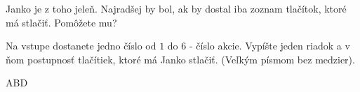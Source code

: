 
Janko je z toho jeleň. Najradšej by bol, ak by dostal iba zoznam tlačítok, ktoré má stlačiť.
Pomôžete mu?

Na vstupe dostanete jedno číslo od $1$ do $6$ - číslo akcie. Vypíšte jeden riadok a v ňom postupnosť
tlačítiek, ktoré má Janko stlačiť. (Veľkým písmom bez medzier).

\vystup
ABD
\koniec


